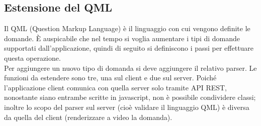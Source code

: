 \documentclass[12pt,a4paper]{article}
\begin{document}
	\subsection{Estensione del QML}
	Il QML (Question Markup Language) è il linguaggio con cui vengono definite le domande. È auspicabile che nel tempo si voglia aumentare i tipi di domande supportati dall’applicazione, quindi di seguito si definiscono i passi per effettuare questa operazione.\\
	Per aggiungere un  nuovo tipo di domanda si deve aggiungere il relativo parser. Le funzioni da estendere sono tre, una sul client e due sul server. Poiché l’applicazione client comunica con quella server solo tramite API REST, nonostante siano entrambe scritte in javascript, non è possibile condividere classi; inoltre lo scopo del parser sul server (cioè validare il linguaggio QML) è diversa da quella del client (renderizzare a video la domanda).
\end{document}
